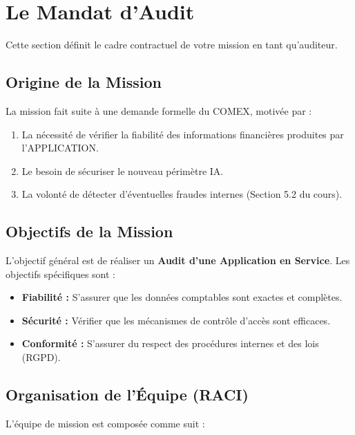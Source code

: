 \section{Le Mandat d'Audit}

Cette section définit le cadre contractuel de votre mission en tant qu'auditeur.

\subsection{Origine de la Mission}

La mission fait suite à une demande formelle du COMEX, motivée par :
\begin{enumerate}
    \item La nécessité de vérifier la fiabilité des informations financières produites par l'APPLICATION.
    \item Le besoin de sécuriser le nouveau périmètre IA.
    \item La volonté de détecter d'éventuelles fraudes internes (Section 5.2 du cours).
\end{enumerate}

\subsection{Objectifs de la Mission}

L'objectif général est de réaliser un \textbf{Audit d'une Application en Service}. Les objectifs spécifiques sont :
\begin{itemize}
    \item \textbf{Fiabilité :} S'assurer que les données comptables sont exactes et complètes.
    \item \textbf{Sécurité :} Vérifier que les mécanismes de contrôle d'accès sont efficaces.
    \item \textbf{Conformité :} S'assurer du respect des procédures internes et des lois (RGPD).
\end{itemize}

\subsection{Organisation de l'Équipe (RACI)}

L'équipe de mission est composée comme suit :

